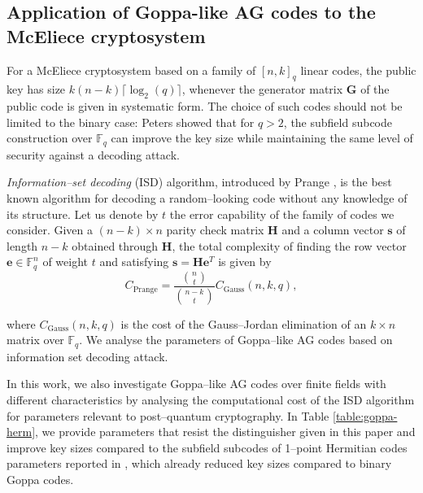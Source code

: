 \documentclass[a4paper]{amsart}
\theoremstyle{definition}
\theoremstyle{remark}
\newcommand{\fq}{\mathbb{F}_{q}}
\begin{document}
\subsection*{Application of Goppa-like AG codes to the McEliece cryptosystem}

For a McEliece cryptosystem based on a family of $[n,k]_q$ linear codes, the public key has size $k(n-k)\lceil \log_2(q) \rceil$, whenever the generator matrix $\mathbf{G}$ of the public code is given in systematic form. The choice of such codes should not be limited to the binary case: Peters \cite{petersIsd} showed that for $q > 2$, the subfield subcode construction over $\fq$ can improve the key size while maintaining the same level of security against a decoding attack. 

\emph{Information--set decoding} (ISD) algorithm, introduced by Prange \cite{prange}, is the best known algorithm for decoding a random--looking code without any knowledge of its structure. Let us denote by $t$ the error capability of the family of codes we consider.  Given a $(n-k) \times n$ parity check matrix $\mathbf{H}$ and a column vector $\mathbf{s}$ of length $n-k$ obtained through $\mathbf{H}$, the total complexity of finding the row vector $\mathbf{e} \in \fq^n$ of weight $t$ and satisfying $\mathbf{s}=\mathbf{H}\mathbf{e}^{T}$ is given by 
$$ C_\text{Prange}= \frac{\binom{n}{t}}{\binom{n-k}{t}}C_\text{Gauss}(n,k,q),$$

where $C_\text{Gauss}(n,k,q)$ is the cost of the Gauss--Jordan elimination of an $k\times n$ matrix over $\mathbb{F}_q$. We analyse the parameters of Goppa--like AG codes based on information set decoding attack.
 
In this work, we also investigate Goppa--like AG codes over finite fields with different characteristics by analysing the computational cost of the ISD algorithm for parameters relevant to post--quantum cryptography. In Table \ref{table:goppa-herm}, we provide parameters that resist the distinguisher given in this paper and improve key sizes compared to the subfield subcodes of 1--point Hermitian codes parameters reported in \cite[Tables~2 and 3]{EKN21crypto}, which already reduced key sizes compared to binary Goppa codes.
\end{document}
